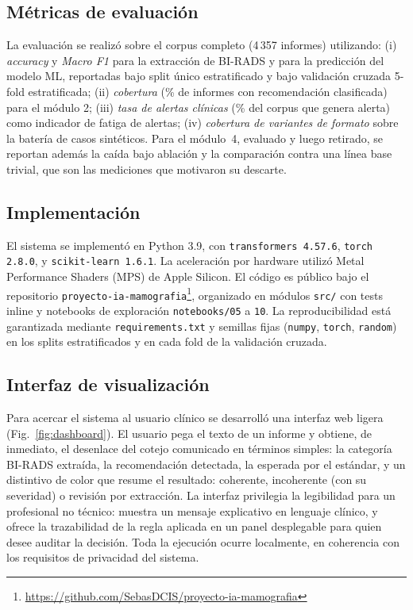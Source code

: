 \documentclass[10pt,journal,a4paper]{IEEEtran}
\begin{document}
\subsection{M\'etricas de evaluaci\'on}
La evaluaci\'on se realiz\'o sobre el corpus completo (4\,357 informes) utilizando: (i) \emph{accuracy} y \emph{Macro F1} para la extracci\'on de BI-RADS y para la predicci\'on del modelo ML, reportadas bajo split \'unico estratificado y bajo validaci\'on cruzada 5-fold estratificada; (ii) \emph{cobertura} (\% de informes con recomendaci\'on clasificada) para el m\'odulo 2; (iii) \emph{tasa de alertas cl\'inicas} (\% del corpus que genera alerta) como indicador de fatiga de alertas; (iv) \emph{cobertura de variantes de formato} sobre la bater\'ia de casos sint\'eticos. Para el m\'odulo~4, evaluado y luego retirado, se reportan adem\'as la ca\'ida bajo ablaci\'on y la comparaci\'on contra una l\'inea base trivial, que son las mediciones que motivaron su descarte.

\subsection{Implementaci\'on}
El sistema se implement\'o en Python 3.9, con \texttt{transformers 4.57.6}, \texttt{torch 2.8.0}, y \texttt{scikit-learn 1.6.1}. La aceleraci\'on por hardware utiliz\'o Metal Performance Shaders (MPS) de Apple Silicon. El c\'odigo es p\'ublico bajo el repositorio \texttt{proyecto-ia-mamografia}\footnote{\url{https://github.com/SebasDCIS/proyecto-ia-mamografia}}, organizado en m\'odulos \texttt{src/} con tests inline y notebooks de exploraci\'on \texttt{notebooks/05} a \texttt{10}. La reproducibilidad est\'a garantizada mediante \texttt{requirements.txt} y semillas fijas (\texttt{numpy}, \texttt{torch}, \texttt{random}) en los splits estratificados y en cada fold de la validaci\'on cruzada.

\subsection{Interfaz de visualizaci\'on}
Para acercar el sistema al usuario cl\'inico se desarroll\'o una interfaz web ligera (Fig.~\ref{fig:dashboard}). El usuario pega el texto de un informe y obtiene, de inmediato, el desenlace del cotejo comunicado en t\'erminos simples: la categor\'ia BI-RADS extra\'ida, la recomendaci\'on detectada, la esperada por el est\'andar, y un distintivo de color que resume el resultado: coherente, incoherente (con su severidad) o revisi\'on por extracci\'on. La interfaz privilegia la legibilidad para un profesional no t\'ecnico: muestra un mensaje explicativo en lenguaje cl\'inico, y ofrece la trazabilidad de la regla aplicada en un panel desplegable para quien desee auditar la decisi\'on. Toda la ejecuci\'on ocurre localmente, en coherencia con los requisitos de privacidad del sistema.
\end{document}
